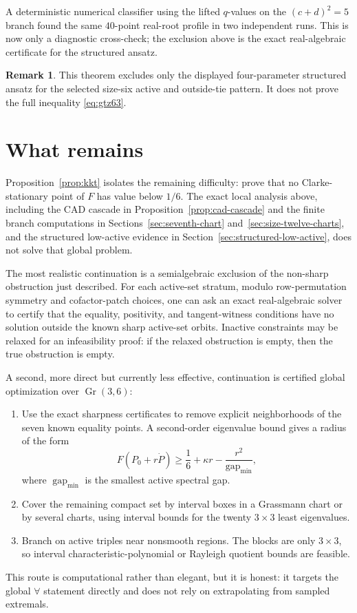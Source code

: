 \documentclass[11pt]{article}
\numberwithin{equation}{section}
\theoremstyle{definition}
\newtheorem{remark}[theorem]{Remark}
\newcommand{\Gr}{\operatorname{Gr}}
\begin{document}
A deterministic numerical classifier using the lifted \(q\)-values on the
\((c+d)^2=5\) branch found the same \(40\)-point real-root profile in two
independent runs.  This is now only a diagnostic cross-check; the exclusion
above is the exact real-algebraic certificate for the structured ansatz.

\begin{remark}
This theorem excludes only the displayed four-parameter structured ansatz for
the selected size-six active and outside-tie pattern.  It does not prove the
full inequality \eqref{eq:gtz63}.
\end{remark}

\section{What remains}

Proposition~\ref{prop:kkt} isolates the remaining difficulty: prove that no
Clarke-stationary point of $F$ has value below $1/6$.  The exact local analysis
above, including the CAD cascade in Proposition~\ref{prop:cad-cascade} and the
finite branch computations in Sections~\ref{sec:seventh-chart}
and~\ref{sec:size-twelve-charts}, and the structured low-active evidence in
Section~\ref{sec:structured-low-active}, does not solve that global problem.

The most realistic continuation is a semialgebraic exclusion of the non-sharp
obstruction just described.  For each active-set stratum, modulo row-permutation
symmetry and cofactor-patch choices, one can ask an exact real-algebraic solver
to certify that the equality, positivity, and tangent-witness conditions have no
solution outside the known sharp active-set orbits.  Inactive constraints may be
relaxed for an infeasibility proof: if the relaxed obstruction is empty, then the
true obstruction is empty.

A second, more direct but currently less effective, continuation is certified
global optimization over $\Gr(3,6)$:
\begin{enumerate}[leftmargin=*]
\item Use the exact sharpness certificates to remove explicit neighborhoods of
the seven known equality points.  A second-order eigenvalue bound gives a radius
of the form
\[
  F(P_0+r\dot P)\ge \frac16+\kappa r-\frac{r^2}{\operatorname{gap}_{\min}},
\]
where $\operatorname{gap}_{\min}$ is the smallest active spectral gap.
\item Cover the remaining compact set by interval boxes in a Grassmann chart or
by several charts, using interval bounds for the twenty $3\times3$ least
eigenvalues.
\item Branch on active triples near nonsmooth regions.  The blocks are only
$3\times3$, so interval characteristic-polynomial or Rayleigh quotient bounds
are feasible.
\end{enumerate}
This route is computational rather than elegant, but it is honest: it targets the
global $\forall$ statement directly and does not rely on extrapolating from
sampled extremals.
\end{document}
